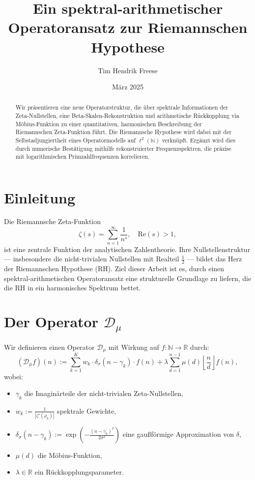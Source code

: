 \documentclass[12pt]{article}
\title{Ein spektral-arithmetischer Operatoransatz zur Riemannschen Hypothese}
\author{Tim Hendrik Freese}
\date{März 2025}
\begin{document}
\maketitle

\begin{abstract}
Wir präsentieren eine neue Operatorstruktur, die über spektrale Informationen der Zeta-Nullstellen, eine Beta-Skalen-Rekonstruktion und arithmetische Rückkopplung via Möbius-Funktion zu einer quantitativen, harmonischen Beschreibung der Riemannschen Zeta-Funktion führt. Die Riemannsche Hypothese wird dabei mit der Selbstadjungiertheit eines Operatormodells auf $\ell^2(\mathbb{N})$ verknüpft. Ergänzt wird dies durch numerische Bestätigung mithilfe rekonstruierter Frequenzspektren, die präzise mit logarithmischen Primzahlfrequenzen korrelieren.
\end{abstract}

\section{Einleitung}
Die Riemannsche Zeta-Funktion
\[
\zeta(s) = \sum_{n=1}^\infty \frac{1}{n^s}, \quad \text{Re}(s) > 1,
\]
ist eine zentrale Funktion der analytischen Zahlentheorie. Ihre Nullstellenstruktur — insbesondere die nicht-trivialen Nullstellen mit Realteil $\frac{1}{2}$ — bildet das Herz der Riemannschen Hypothese (RH). Ziel dieser Arbeit ist es, durch einen spektral-arithmetischen Operatoransatz eine strukturelle Grundlage zu liefern, die die RH in ein harmonisches Spektrum bettet.

\section{Der Operator \texorpdfstring{\boldmath$\mathcal{D}_\mu$}{Dmu}}
Wir definieren einen Operator $\mathcal{D}_\mu$ mit Wirkung auf $f : \mathbb{N} \to \mathbb{R}$ durch:
\begin{equation}
(\mathcal{D}_\mu f)(n) := \sum_{k=1}^{K} w_k \cdot \delta_\sigma(n - \gamma_k) \cdot f(n) + \lambda \sum_{d=1}^{n-1} \mu(d) \left\lfloor \frac{n}{d} \right\rfloor f(n),
\end{equation}
wobei:
\begin{itemize}
    \item $\gamma_k$ die Imaginärteile der nicht-trivialen Zeta-Nullstellen,
    \item $w_k := \frac{1}{|\zeta'(\rho_k)|}$ spektrale Gewichte,
    \item $\delta_\sigma(n - \gamma_k) := \exp\left( -\frac{(n - \gamma_k)^2}{2\sigma^2} \right)$ eine gaußförmige Approximation von $\delta$,
    \item $\mu(d)$ die Möbius-Funktion,
    \item $\lambda \in \mathbb{R}$ ein Rückkopplungsparameter.
\end{itemize}
\end{document}
